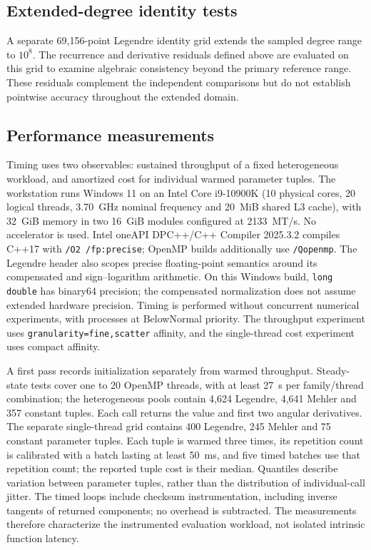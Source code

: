 ﻿\documentclass[11pt,a4paper]{article}
\begin{document}
\subsection{Extended-degree identity tests}
\label{sec:robustness_protocol}

A separate 69,156-point Legendre identity grid extends the sampled degree range to $10^8$. The recurrence and derivative residuals defined above are evaluated on this grid to examine algebraic consistency beyond the primary reference range. These residuals complement the independent comparisons but do not establish pointwise accuracy throughout the extended domain.

\subsection{Performance measurements}
\label{sec:timing_protocol}

Timing uses two observables: sustained throughput of a fixed heterogeneous workload, and amortized cost for individual warmed parameter tuples. The workstation runs Windows 11 on an Intel Core i9-10900K (10 physical cores, 20 logical threads, 3.70~GHz nominal frequency and 20~MiB shared L3 cache), with 32~GiB memory in two 16~GiB modules configured at 2133~MT/s. No accelerator is used. Intel oneAPI DPC++/C++ Compiler 2025.3.2 compiles C++17 with \texttt{/O2 /fp:precise}; OpenMP builds additionally use \texttt{/Qopenmp}. The Legendre header also scopes precise floating-point semantics around its compensated and sign--logarithm arithmetic. On this Windows build, \texttt{long double} has binary64 precision; the compensated normalization does not assume extended hardware precision. Timing is performed without concurrent numerical experiments, with processes at BelowNormal priority. The throughput experiment uses \texttt{granularity=fine,scatter} affinity, and the single-thread cost experiment uses compact affinity.

A first pass records initialization separately from warmed throughput. Steady-state tests cover one to 20 OpenMP threads, with at least 27~s per family/thread combination; the heterogeneous pools contain 4,624 Legendre, 4,641 Mehler and 357 constant tuples. Each call returns the value and first two angular derivatives. The separate single-thread grid contains 400 Legendre, 245 Mehler and 75 constant parameter tuples. Each tuple is warmed three times, its repetition count is calibrated with a batch lasting at least 50~ms, and five timed batches use that repetition count; the reported tuple cost is their median. Quantiles describe variation between parameter tuples, rather than the distribution of individual-call jitter. The timed loops include checksum instrumentation, including inverse tangents of returned components; no overhead is subtracted. The measurements therefore characterize the instrumented evaluation workload, not isolated intrinsic function latency.
\end{document}
